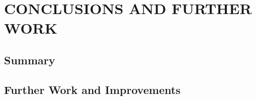 %
%

\chapter{CONCLUSIONS AND FURTHER WORK}\label{ch:conclusions-and-further-work}

\section{Summary}\label{sec:summary}


\section{Further Work and Improvements}\label{sec:further-work-and-improvements}
